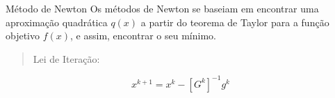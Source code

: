 \begin{frame}{Método de Newton}
	Os métodos de Newton se baseiam em encontrar uma aproximação quadrática $ q(x) $ a partir do teorema de Taylor para a função objetivo $ f(x) $, e assim, encontrar o seu mínimo.
	
	\begin{quote}
		\centering
		Lei de Iteração:
	\end{quote}

	\begin{equation}
	x^{k+1} = x^k - [G^k]^{-1}g^k
	\end{equation}
	
	
\end{frame}